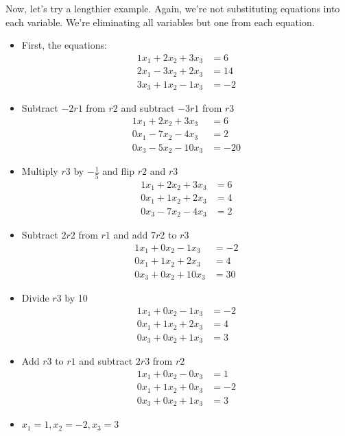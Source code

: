 \noindent Now, let's try a lengthier example. Again, we're not substituting equations into each variable. We're eliminating all variables but one from each equation.

\begin{itemize}
    \item First, the equations:
    \begin{align*}
        1x_1 + 2x_2 + 3x_3 & = 6 \\
        2x_1 - 3x_2 + 2x_3 & = 14 \\
        3x_3 + 1x_2 - 1x_3 & = -2 
    \end{align*}
    \item Subtract $-2r1$ from $r2$ and subtract $-3r1$ from $r3$
    \begin{align*}
        1x_1 + 2x_2 + 3x_3 & = 6 \\
        0x_1 - 7x_2 - 4x_3 & = 2 \\
        0x_3 - 5x_2 - 10x_3 & = -20
    \end{align*}
    \item Multiply $r3$ by $-\frac{1}{5}$ and flip $r2$ and $r3$
    \begin{align*}
        1x_1 + 2x_2 + 3x_3 & = 6 \\
        0x_1 + 1x_2 + 2x_3 & = 4 \\
        0x_3 - 7x_2 - 4x_3 & = 2
    \end{align*}
    \item Subtract $2r2$ from $r1$ and add $7r2$ to $r3$
    \begin{align*}
        1x_1 + 0x_2 - 1x_3 & = -2 \\
        0x_1 + 1x_2 + 2x_3 & = 4 \\
        0x_3 + 0x_2 + 10x_3 & = 30
    \end{align*}
    \item Divide $r3$ by 10
    \begin{align*}
        1x_1 + 0x_2 - 1x_3 & = -2 \\
        0x_1 + 1x_2 + 2x_3 & = 4 \\
        0x_3 + 0x_2 + 1x_3 & = 3
    \end{align*}
    \item Add $r3$ to $r1$ and subtract $2r3$ from $r2$
    \begin{align*}
        1x_1 + 0x_2 - 0x_3 & = 1 \\
        0x_1 + 1x_2 + 0x_3 & = -2 \\
        0x_3 + 0x_2 + 1x_3 & = 3
    \end{align*}
    \item $x_1 = 1, x_2 = -2, x_3 = 3$
\end{itemize}

